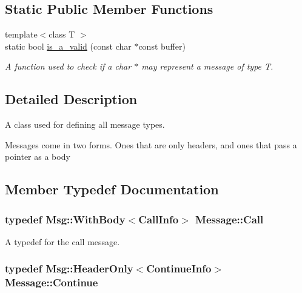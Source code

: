 \subsection*{Static Public Member Functions}
\begin{DoxyCompactItemize}
\item 
{\footnotesize template$<$class T $>$ }\\static bool \hyperlink{class_message_ada73859c8d199a7925b0ba3999cc3eef}{is\+\_\+a\+\_\+valid} (const char $\ast$const buffer)
\begin{DoxyCompactList}\small\item\em A function used to check if a char $\ast$ may represent a message of type T. \end{DoxyCompactList}\end{DoxyCompactItemize}


\subsection{Detailed Description}
A class used for defining all message types. 

Messages come in two forms. Ones that are only headers, and ones that pass a pointer as a body 

\subsection{Member Typedef Documentation}
\subsubsection[{\texorpdfstring{Call}{Call}}]{\setlength{\rightskip}{0pt plus 5cm}typedef {\bf Msg\+::\+With\+Body}$<${\bf Call\+Info}$>$ {\bf Message\+::\+Call}}\hypertarget{class_message_a65eabf9d1dcd603d2e7c14c5274a5bdb}{}\label{class_message_a65eabf9d1dcd603d2e7c14c5274a5bdb}


A typedef for the call message. 

\subsubsection[{\texorpdfstring{Continue}{Continue}}]{\setlength{\rightskip}{0pt plus 5cm}typedef {\bf Msg\+::\+Header\+Only}$<${\bf Continue\+Info}$>$ {\bf Message\+::\+Continue}}\hypertarget{class_message_a3575d142bf847cc5a7aecd718434fe4f}{}\label{class_message_a3575d142bf847cc5a7aecd718434fe4f}


